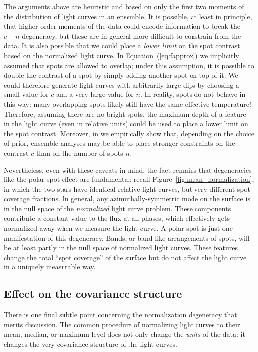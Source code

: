 \documentclass[modern,linenumbers]{aastex62}
\begin{document}
The arguments above are heuristic and based on only the first two moments
of the distribution of light curves in an ensemble.
It is possible, at least in principle, that higher order moments of the data
could encode information to
break the $c-n$ degeneracy, but these are in general more difficult
to constrain from the data. It is also possible that we could place a
\emph{lower limit} on the spot contrast based on the normalized light
curve. In Equation~(\ref{eq:fapprox}) we implicitly assumed that
spots are allowed to overlap; under this assumption, it is possible to
double the contrast of a spot by simply adding another spot on top
of it. We could therefore generate light curves with arbitrarily
large dips by choosing a small value for $c$ and a very large value for $n$.
In reality, spots do not behave in this way: many overlapping spots
likely still have the same effective temperature! Therefore,
assuming there are no bright spots,
the maximum depth of a feature in the light curve (even in relative units)
could be used to place a lower limit on the spot contrast.
Moreover, in  we empirically show that, depending on the choice
of prior, ensemble analyses may be able to place stronger constraints on
the contrast $c$ than on the number of spots $n$.

Nevertheless, even with these caveats in mind, the fact remains
that degeneracies like the polar spot effect are fundamental: recall
Figure~\ref{fig:mean_normalization}, in which the two stars
have identical relative light curves, but very different spot coverage
fractions. In general, any azimuthally-symmetric mode on the surface
is in the null space of the \emph{normalized} light curve problem. These
components contribute a constant value to the flux at all phases, which
effectively gets normalized away when we measure the light curve. A
polar spot is just one manifestation of this degeneracy. Bands, or
band-like arrangements of spots, will be at least partly in the null
space of normalized light curves. These features change the total ``spot coverage''
of the surface but do not affect the light curve in a uniquely measurable
way.

\subsection{Effect on the covariance structure}
\label{sec:covariance}

There is one final subtle point concerning the normalization degeneracy that merits discussion.
The common procedure of normalizing light curves to their mean, median, or
maximum level does not only change the \emph{units} of the data: it changes
the very covariance structure of the light curves.
\end{document}
